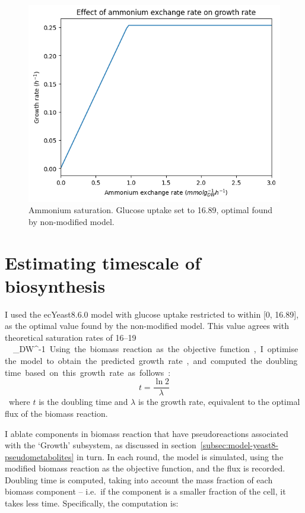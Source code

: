 \begin{figure}
  \centering
  \includegraphics[width=.9\linewidth]{ecYeast8-ammonium-saturation.png}
  \caption{
    Ammonium saturation.
    Glucose uptake set to 16.89, optimal found by non-modified model.}
  \label{fig:model-saturation-ammonium}
\end{figure}

\section{Estimating timescale of biosynthesis}
\label{sec:model-timescale}

I used the ecYeast8.6.0 model with glucose uptake restricted to within [0, 16.89], as the optimal value found by the non-modified model.
This value agrees with theoretical saturation rates of 16--19 \SI{}{\milli\mol~\gram_{DW}^{-1}}.
Using the biomass reaction as the objective function, I optimise the model to obtain the predicted growth rate, and computed the doubling time based on this growth rate as follows:

\begin{equation}
  t = \frac{\ln 2}{\lambda}
  \label{eq:model-doubling-time}
\end{equation}

where $t$ is the doubling time and $\lambda$ is the growth rate, equivalent to the optimal flux of the biomass reaction.

I ablate components in biomass reaction that have pseudoreactions associated with the `Growth' subsystem, as discussed in section~\ref{subsec:model-yeast8-pseudometabolites} in turn.
In each round, the model is simulated, using the modified biomass reaction as the objective function, and the flux is recorded.
Doubling time is computed, taking into account the mass fraction of each biomass component -- i.e.\ if the component is a smaller fraction of the cell, it takes less time.
Specifically, the computation is:

